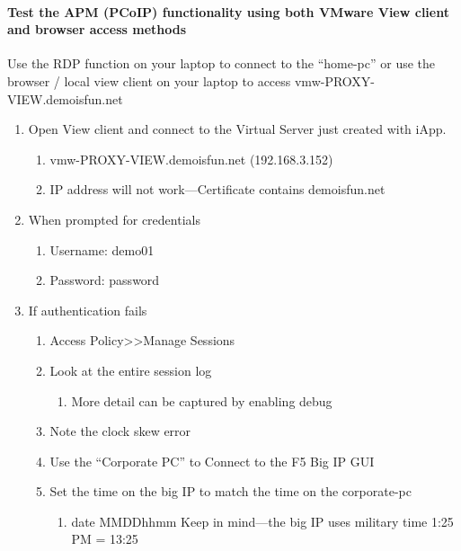 \documentclass[letterpaper,10pt,english]{sphinxmanual}
\begin{document}
\paragraph{Test the APM (PCoIP) functionality using both VMware View client and browser access methods}
\label{\detokenize{class2/module1/lab1:test-the-apm-pcoip-functionality-using-both-vmware-view-client-and-browser-access-methods}}
Use the RDP function on your laptop to connect to the “home-pc” or use
the browser / local view client on your laptop to access
vmw-PROXY-VIEW.demoisfun.net
\begin{enumerate}
\item {} 
Open View client and connect to the Virtual Server just created with
iApp.
\begin{enumerate}
\item {} 
vmw-PROXY-VIEW.demoisfun.net (192.168.3.152)

\item {} 
IP address will not work—Certificate contains demoisfun.net

\end{enumerate}

\item {} 
When prompted for credentials
\begin{enumerate}
\item {} 
Username: demo01

\item {} 
Password: password

\end{enumerate}

\item {} 
If authentication fails
\begin{enumerate}
\item {} 
Access Policy\textgreater{}\textgreater{}Manage Sessions

\item {} 
Look at the entire session log
\begin{enumerate}
\item {} 
More detail can be captured by enabling debug

\end{enumerate}

\item {} 
Note the clock skew error

\item {} 
Use the “Corporate PC” to Connect to the F5 Big IP GUI

\item {} 
Set the time on the big IP to match the time on the corporate-pc
\begin{enumerate}
\item {} 
date MMDDhhmm Keep in mind—the big IP uses military time 1:25
PM = 13:25


\end{enumerate}
\end{enumerate}
\end{enumerate}
\end{document}
